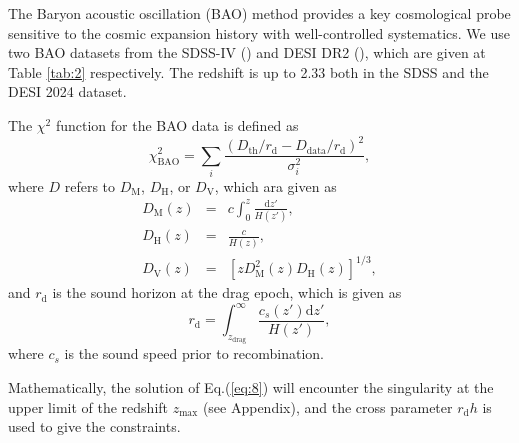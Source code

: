 \documentclass[twocolumn]{aastex631}
\begin{document}
   The Baryon acoustic oscillation (BAO) method provides a key cosmological probe
   sensitive to the cosmic expansion history with well-controlled systematics.
   We use two BAO datasets from the SDSS-IV (\cite{PhysRevD.103.083533}) and 
   DESI DR2 (\cite{desicollaboration2025desidr2resultsii}),
   which are given at Table \ref{tab:2} respectively.
   The redshift is up to 2.33 both in the SDSS and the DESI 2024 dataset.

   The $\chi^2$ function for the BAO data is defined as
   \begin{equation}
      \chi_{\text{BAO}}^2=\sum_i\frac{(D_{\text{th}}/r_{\text{d}}-D_{\text{data}}/r_{\text{d}})^2}{\sigma_i^2},
      \label{eq:17}
   \end{equation}
   where $D$ refers to $D_{\text{M}}$, $D_{\text{H}}$, or $D_{\text{V}}$, which ara given as
   \begin{eqnarray}
      D_{\text{M}}(z)&=&c\int_0^z\frac{\text{d}z'}{H(z')},\\
      D_{\text{H}}(z)&=&\frac{c}{H(z)},\\
      D_{\text{V}}(z)&=&\left[zD_{\text{M}}^2(z)D_{\text{H}}(z)\right]^{1/3},
      \label{eq:18-20}
   \end{eqnarray}
   and $r_{\text{d}}$ is the sound horizon at the drag epoch, which is given as
   \begin{equation}
      r_{\text{d}}=\int_{z_{\text{drag}}}^{\infty}\frac{c_s(z')\text{d}z'}{H(z')},
      \label{eq:21}
   \end{equation}
   where $c_s$ is the sound speed prior to recombination.

   Mathematically, the solution of Eq.(\ref{eq:8}) will encounter the singularity
   at the upper limit of the redshift $z_{\max}$ (see Appendix), and the cross 
   parameter $r_{\text{d}}h$ is used to give the constraints.
\end{document}
